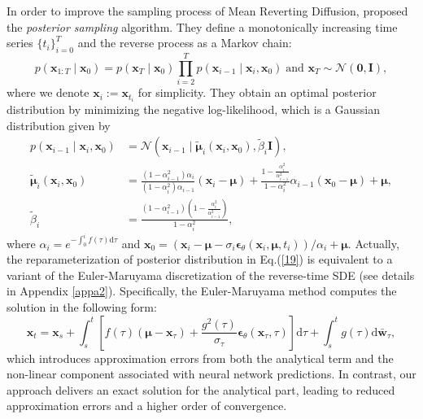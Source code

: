 In order to improve the sampling process of Mean Reverting Diffusion, \cite{luo2024posterior} proposed the \textit{posterior sampling} algorithm. They define a monotonically increasing time series $\{t_i\}_{i=0}^T$ and the reverse process as a Markov chain:
\begin{equation}
    p(\boldsymbol{x}_{1:T}\mid \boldsymbol{x}_0)=p(\boldsymbol{x}_T\mid \boldsymbol{x}_0)\prod_{i=2}^Tp(\boldsymbol{x}_{i-1}\mid \boldsymbol{x}_i,\boldsymbol{x}_0)\;
    \text{and }\boldsymbol{x}_T\sim\mathcal{N}(\boldsymbol{0},\boldsymbol{I}),
\end{equation}
where we denote $\boldsymbol{x}_i:=\boldsymbol{x}_{t_i}$ for simplicity. They obtain an optimal posterior distribution by minimizing the negative log-likelihood, which is a Gaussian distribution given by
\begin{equation}
\begin{aligned}
    p(\boldsymbol{x}_{i-1}\mid \boldsymbol{x}_{i},\boldsymbol{x}_0)&=\mathcal{N}(\boldsymbol{x}_{i-1}\mid\tilde{\boldsymbol\mu}_{i}(\boldsymbol{x}_{i},\boldsymbol{x}_0), \tilde{\beta}_{i}\boldsymbol{I}),\\
    \tilde{\boldsymbol\mu}_{i}(\boldsymbol{x}_{i},\boldsymbol{x}_{0})&=\frac{(1-\alpha^2_{i-1})\alpha_{i}}{(1-\alpha^2_{i})\alpha_{i-1}}(\boldsymbol{x}_{i}-\boldsymbol\mu)+\frac{1-\frac{\alpha^2_{i}}{\alpha^2_{i-1}}}{1-\alpha^2_{i}}\alpha_{i-1}(\boldsymbol{x}_{0}-\boldsymbol\mu)+\boldsymbol\mu,\\
    \tilde{\beta}_{i}&=\frac{(1-\alpha^2_{i-1})(1-\frac{\alpha^2_{i}}{\alpha^2_{i-1}})}{1-\alpha^2_{i}},
    \label{19}
\end{aligned}
\end{equation}
where $\alpha_{i}=e^{-\int_{0}^{i}f(\tau)\mathrm{d}\tau}$ and $\boldsymbol{x}_0=\left(\boldsymbol{x}_{i}-\boldsymbol\mu-\sigma_i{\boldsymbol\epsilon}_\theta(\boldsymbol{x}_i,\boldsymbol\mu,t_i)\right)/\alpha_{i}+\boldsymbol\mu$. Actually, the reparameterization of posterior distribution in Eq.(\ref{19}) is equivalent to a variant of the Euler-Maruyama discretization of the reverse-time SDE (see details in Appendix \ref{appa2}). Specifically, the Euler-Maruyama method computes the solution in the following form:
\begin{equation}
\boldsymbol{x}_t=\boldsymbol{x}_s+\int_s^t \left[f(\tau)\left(\boldsymbol{\mu}-\boldsymbol{x}_\tau\right)+\frac{g^2(\tau)}{\sigma_\tau}\boldsymbol{\epsilon}_\theta(\boldsymbol{x}_\tau,\tau)\right]\mathrm{d}\tau
+\int_s^tg(\tau)\mathrm{d}\bar{\boldsymbol{w}}_\tau,
\end{equation}
which introduces approximation errors from both the analytical term and the non-linear component associated with neural network predictions. In contrast, our approach delivers an exact solution for the analytical part, leading to reduced approximation errors and a higher order of convergence.
